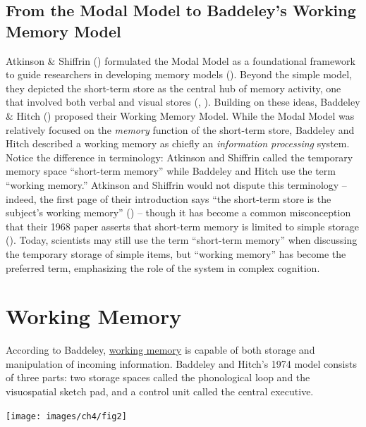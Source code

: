 \documentclass[
]{krantz}
\begin{document}
\subsection*{From the Modal Model to Baddeley's Working Memory Model}\label{from-the-modal-model-to-baddeleys-working-memory-model}


Atkinson \& Shiffrin () formulated the Modal Model as a foundational framework to guide researchers in developing memory models (). Beyond the simple model, they depicted the short-term store as the central hub of memory activity, one that involved both verbal and visual stores (, ). Building on these ideas, Baddeley \& Hitch () proposed their Working Memory Model. While the Modal Model was relatively focused on the \emph{memory} function of the short-term store, Baddeley and Hitch described a working memory as chiefly an \emph{information processing} system. Notice the difference in terminology: Atkinson and Shiffrin called the temporary memory space ``short-term memory'' while Baddeley and Hitch use the term ``working memory.'' Atkinson and Shiffrin would not dispute this terminology -- indeed, the first page of their introduction says ``the short-term store is the subject's working memory'' () -- though it has become a common misconception that their 1968 paper asserts that short-term memory is limited to simple storage (). Today, scientists may still use the term ``short-term memory'' when discussing the temporary storage of simple items, but ``working memory'' has become the preferred term, emphasizing the role of the system in complex cognition.

\section{Working Memory}\label{working-memory}

According to Baddeley, \hyperref[working-memory]{working memory} is capable of both storage and manipulation of incoming information. Baddeley and Hitch's 1974 model consists of three parts: two storage spaces called the phonological loop and the visuospatial sketch pad, and a control unit called the central executive.

\begin{center}\texttt{[image: images/ch4/fig2]} \end{center}
\end{document}
